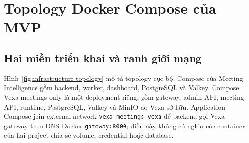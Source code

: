 \section{Topology Docker Compose của MVP}
\subsection{Hai miền triển khai và ranh giới mạng}
Hình~\ref{fig:infrastructure-topology} mô tả topology cục bộ. Compose của Meeting Intelligence gồm backend, worker, dashboard, PostgreSQL và Valkey. Compose Vexa meetings-only là một deployment riêng, gồm gateway, admin API, meeting API, runtime, PostgreSQL, Valkey và MinIO do Vexa sở hữu. Application Compose join external network \texttt{vexa-meetings\_vexa} để backend gọi Vexa gateway theo DNS Docker \texttt{gateway:8000}; điều này không có nghĩa các container của hai project chia sẻ volume, credential hoặc database.


